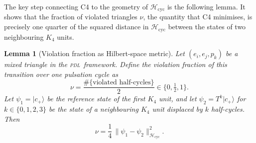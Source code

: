 \documentclass[12pt,a4paper]{article}
\newtheorem{lemma}[theorem]{Lemma}
\newcommand{\Kfour}{K_4}
\newcommand{\PDL}{\textsc{pdl}}
\newcommand{\Hcyc}{\mathcal{H}_{\mathrm{cyc}}}
\newcommand{\cplu}{|c_+\rangle}
\begin{document}
The key step connecting C4 to the geometry of $\Hcyc$ is the following lemma. It shows that the fraction of violated triangles $\nu$, the quantity that C4 minimises, is precisely one quarter of the squared distance in $\Hcyc$ between the states of two neighbouring $\Kfour$ units.

\begin{lemma}[Violation fraction as Hilbert-space metric]
\label{lem:nu_Hcyc}
Let $(e_i, e_j, p_k)$ be a mixed triangle in the \PDL\ framework. Define the \emph{violation fraction} of this transition over one pulsation cycle as
\begin{equation}
\nu = \frac{\#\{\text{violated half-cycles}\}}{2} \in \{0, \tfrac{1}{2}, 1\}.
\label{eq:nu_def}
\end{equation}
Let $\psi_1 = \cplu$ be the reference state of the first $\Kfour$ unit, and let $\psi_2 = T^k\cplu$ for $k \in \{0, 1, 2, 3\}$ be the state of a neighbouring $\Kfour$ unit displaced by $k$ half-cycles. Then
\begin{equation}
\boxed{\nu = \frac{1}{4}\,\|\psi_1 - \psi_2\|^2_{\Hcyc}.}
\label{eq:nu_metric}
\end{equation}
\end{lemma}
\end{document}
